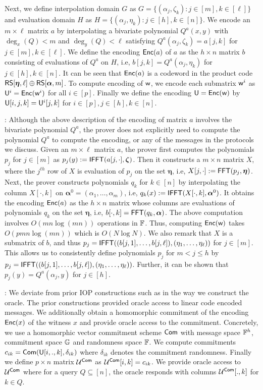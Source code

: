 Next, we define interpolation domain $G$ as $G=\{(\alpha_j,\zeta_k): j\in[m],
k\in [\ell]\}$ and evaluation domain $H$ as $H=\{(\alpha_j,\eta_k): j\in [h],
k\in [n]\}$. We encode an $m\times \ell$ matrix $a$ by interpolating a
bivariate polynomial $Q^a(x,y)$ with $\deg_x(Q)<m$ and $\deg_y(Q)<\ell$
satisfying $Q^a(\alpha_j,\zeta_k)=a[j,k]$ for $j\in [m],k\in [\ell]$. We define
the encoding $\mathsf{Enc}(a)$ of $a$ as the $h\times n$ matrix $b$ consisting of
evaluations of $Q^a$ on $H$, i.e, $b[j,k]=Q^a(\alpha_j,\eta_k)$ for $j\in
[h],k\in [n]$. It can be seen that $\mathsf{Enc}(a)$ is a codeword in the product code
$\mathsf{RS}[\bm{\eta},\ell]\oplus \mathsf{RS}[\bm{\alpha},m]$. To compute encoding of $\mathsf{w}$, we
encode each submatrix $\mathsf{w}^i$ as $\mathsf{U}^i=\mathsf{Enc}(\mathsf{w}^i)$ for all $i\in [p]$.
Finally we define the encoding $\mathsf{U}=\mathsf{Enc}(\mathsf{w})$ by $\mathsf{U}[i,j,k]=\mathsf{U}^i[j,k]$
for $i\in [p], j\in [h], k\in [n]$.\medskip

: Although the above
description of the encoding of matrix $a$ involves the bivariate polynomial
$Q^a$, the prover does not explicitly need to compute the polynomial $Q^a$ to compute the
encoding, or any of the messages in the protocols we discuss. Given an $m\times \ell$
matrix $a$, the prover first computes the polynomials $p_j$ for $j\in
[m]$ as $p_j(y) := \mathsf{IFFT}(a[j,\cdot], \bm{\zeta})$. Then it constructs a $m\times n$
matrix $X$, where the $j^{th}$ row of $X$ is evaluation of $p_j$ on the set
$\bm{\eta}$, i.e, $X[j,\cdot] := \mathsf{FFT}(p_j, \bm{\eta})$. Next, the prover constructs
polynomials $q_k$ for $k\in [n]$ by interpolating the column $X[\cdot,k]$ on
$\bm{\alpha}^0 = (\alpha_1,\ldots,\alpha_m)$, i.e, $q_k(x) := \mathsf{IFFT}(X[\cdot,k],
\bm{\alpha}^0)$. It obtains the encoding $\mathsf{Enc}(a)$ as the $h\times n$ matrix
whose columns are evaluations of polynomials $q_k$ on the set $\bm{\eta}$, i.e,
$b[\cdot,k]=\mathsf{FFT}(q_k,\bm{\alpha})$. The above computation involves
$O(mn\log(mn))$ operations in $\mathbb{F}$. Thus, computing $\mathsf{Enc}(\mathsf{w})$ takes
$O(pmn\log(mn))$ which is $O(N\log{N})$. We also remark that $X$ is a submatrix
of $b$, and thus
$p_j=\mathsf{IFFT}((b[j,1],\ldots,b[j,\ell]),(\eta_1,\ldots,\eta_{\ell}))$ for $j\in
[m]$. This allows us to consistently define polynomials $p_j$ for $m<j\leq h$ by
$p_j=\mathsf{IFFT}((b[j,1],\ldots,b[j,\ell]),(\eta_1,\ldots,\eta_{\ell}))$. Further, it
can be shown that $p_j(y)=Q^a(\alpha_j,y)$ for $j\in [h]$.\medskip


: We deviate from prior IOP constructions
such as \cite{Ligero2017,Aurora} in the way we construct the oracle. The prior
constructions provided oracle access to linear code encoded messages. We
additionally obtain a homomorphic commitment of the encoding $\mathsf{Enc}(x)$ of the
witness $x$ and provide oracle access to the commitment. Concretely, we use a
homomorphic vector commitment scheme $\mathsf{Com}$ with message space $\mathbb{F}^h$,
commitment space $\mathbb{G}$ and randomness space $\mathbb{F}$. We compute commitments
$c_{ik}=\mathsf{Com}(\mathsf{U}[i,.,k],\delta_{ik})$ where $\delta_{ik}$ denotes the
commitment randomness. Finally we define $p\times n$ matrix $\mathcal{U}^{\mathsf{Com}}$ as
$\mathcal{U}^{\mathsf{Com}}[i,k]=c_{ik}$. We provide oracle access to $\mathcal{U}^{\mathsf{Com}}$ where for a
query $Q\subseteq [n]$, the oracle responds with columns $\mathcal{U}^{\mathsf{Com}}[.,k]$ for
$k\in Q$.\smallskip



